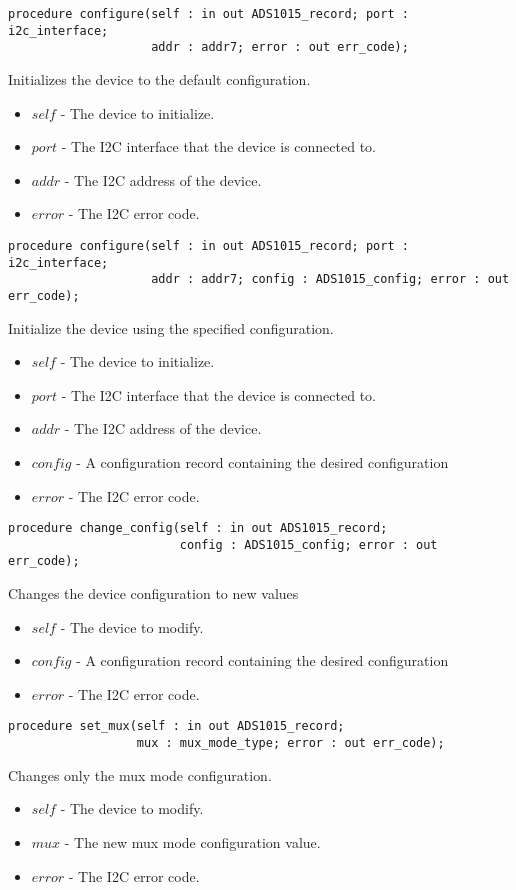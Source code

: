 \documentclass[10pt, openany]{book}
\begin{document}
\begin{lstlisting}
procedure configure(self : in out ADS1015_record; port : i2c_interface;
                    addr : addr7; error : out err_code);
\end{lstlisting}
Initializes the device to the default configuration.
\begin{itemize}
  \item $self$ - The device to initialize.
  \item $port$ - The I2C interface that the device is connected to.
  \item $addr$ - The I2C address of the device.
  \item $error$ - The I2C error code.
\end{itemize}

\begin{lstlisting}
procedure configure(self : in out ADS1015_record; port : i2c_interface;
                    addr : addr7; config : ADS1015_config; error : out err_code);
\end{lstlisting}
Initialize the device using the specified configuration.
\begin{itemize}
  \item $self$ - The device to initialize.
  \item $port$ - The I2C interface that the device is connected to.
  \item $addr$ - The I2C address of the device.
  \item $config$ - A configuration record containing the desired configuration
  \item $error$ - The I2C error code.
\end{itemize}

\begin{lstlisting}
procedure change_config(self : in out ADS1015_record;
                        config : ADS1015_config; error : out err_code);
\end{lstlisting}
Changes the device configuration to new values
\begin{itemize}
  \item $self$ - The device to modify.
  \item $config$ - A configuration record containing the desired configuration
  \item $error$ - The I2C error code.
\end{itemize}

\begin{lstlisting}
procedure set_mux(self : in out ADS1015_record;
                  mux : mux_mode_type; error : out err_code);
\end{lstlisting}
Changes only the mux mode configuration.
\begin{itemize}
  \item $self$ - The device to modify.
  \item $mux$ - The new mux mode configuration value.
  \item $error$ - The I2C error code.
\end{itemize}
\end{document}
